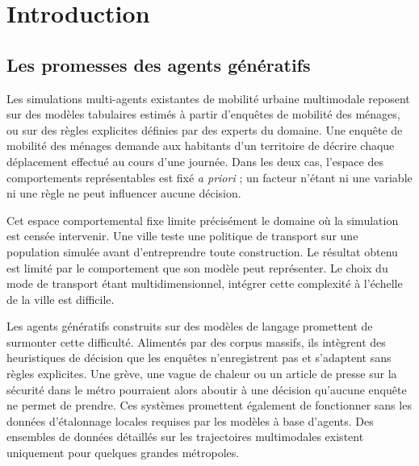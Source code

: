 
\section{Introduction}
\label{sec:intro}

\subsection{Les promesses des agents génératifs}
\label{sec:promise}

Les simulations multi-agents existantes de mobilité urbaine multimodale reposent sur des modèles tabulaires estimés à partir d'enquêtes de mobilité des ménages, ou sur des règles explicites définies par des experts du domaine. Une enquête de mobilité des ménages demande aux habitants d'un territoire de décrire chaque déplacement effectué au cours d'une journée. Dans les deux cas, l'espace des comportements représentables est fixé \emph{a priori} ; un facteur n'étant ni une variable ni une règle ne peut influencer aucune décision.

Cet espace comportemental fixe limite précisément le domaine où la simulation est censée intervenir. Une ville teste une politique de transport sur une population simulée avant d'entreprendre toute construction. Le résultat obtenu est limité par le comportement que son modèle peut représenter. Le choix du mode de transport étant multidimensionnel, intégrer cette complexité à l'échelle de la ville est difficile.

Les agents génératifs construits sur des modèles de langage promettent de surmonter cette difficulté. Alimentés par des corpus massifs, ils intègrent des heuristiques de décision que les enquêtes n'enregistrent pas et s'adaptent sans règles explicites. Une grève, une vague de chaleur ou un article de presse sur la sécurité dans le métro pourraient alors aboutir à une décision qu'aucune enquête ne permet de prendre. Ces systèmes promettent également de fonctionner sans les données d'étalonnage locales requises par les modèles à base d'agents. Des ensembles de données détaillés sur les trajectoires multimodales existent uniquement pour quelques grandes métropoles.

